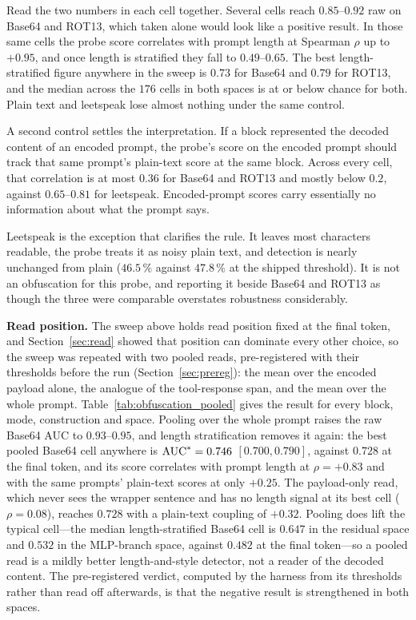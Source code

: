 Read the two numbers in each cell together. Several cells reach $0.85$--$0.92$ raw on Base64 and ROT13, which taken
alone would look like a positive result. In those same cells the probe score correlates with prompt length at
Spearman $\rho$ up to $+0.95$, and once length is stratified they fall to $0.49$--$0.65$. The best length-stratified
figure anywhere in the sweep is $0.73$ for Base64 and $0.79$ for ROT13, and the median across the $176$ cells in both spaces is at or
below chance for both. Plain text and leetspeak lose almost nothing under the same control.

A second control settles the interpretation. If a block represented the decoded content of an encoded prompt, the
probe's score on the encoded prompt should track that same prompt's plain-text score at the same block. Across every
cell, that correlation is at most $0.36$ for Base64 and ROT13 and mostly below $0.2$, against $0.65$--$0.81$ for
leetspeak. Encoded-prompt scores carry essentially no information about what the prompt says.

Leetspeak is the exception that clarifies the rule. It leaves most characters readable, the probe treats it as noisy
plain text, and detection is nearly unchanged from plain ($46.5\,\%$ against $47.8\,\%$ at the shipped threshold). It
is not an obfuscation for this probe, and reporting it beside Base64 and ROT13 as though the three were comparable
overstates robustness considerably.

\textbf{Read position.} The sweep above holds read position fixed at the final token, and Section~\ref{sec:read}
showed that position can dominate every other choice, so the sweep was repeated with two pooled reads, pre-registered
with their thresholds before the run (Section~\ref{sec:prereg}): the mean over the encoded payload alone, the
analogue of the tool-response span, and the mean over the whole prompt. Table~\ref{tab:obfuscation_pooled} gives the
result for every block, mode, construction and space. Pooling over the whole prompt raises the raw Base64 AUC to
$0.93$--$0.95$, and length stratification removes it again: the best pooled Base64 cell anywhere is
$\text{AUC}^{*}{} = 0.746$ $[0.700, 0.790]$, against $0.728$ at the final token, and its score correlates with prompt length
at $\rho = +0.83$ and with the same prompts' plain-text scores at only $+0.25$. The payload-only read, which never sees
the wrapper sentence and has no length signal at its best cell ($\rho = 0.08$), reaches $0.728$ with a plain-text
coupling of $+0.32$. Pooling does lift the typical cell---the median length-stratified Base64 cell is $0.647$ in the
residual space and $0.532$ in the MLP-branch space, against $0.482$ at the final token---so a pooled read is a mildly
better length-and-style detector, not a reader of the decoded content. The pre-registered verdict, computed by the
harness from its thresholds rather than read off afterwards, is that the negative result is strengthened in both
spaces.

